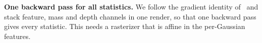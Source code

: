 
\item \textbf{One backward pass for all statistics.} We follow the gradient
identity of~\cite{joseph2025gradbp} and stack feature, mass and depth channels
in one render, so that one backward pass gives every statistic. This needs a
rasterizer that is affine in the per-Gaussian features.

